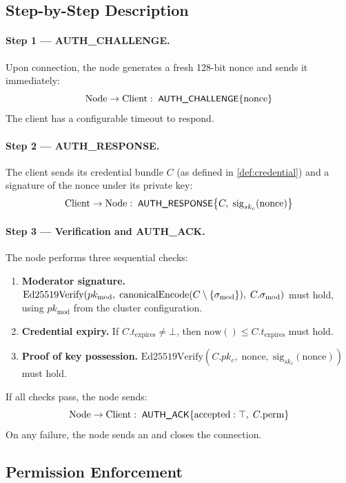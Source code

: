 \subsection{Step-by-Step Description}

\paragraph{Step 1 — AUTH\_CHALLENGE.}
Upon connection, the node generates a fresh 128-bit nonce and sends it
immediately:
\[
  \mathrm{Node} \to \mathrm{Client}:\; \textsf{\small AUTH\_CHALLENGE}\{\mathrm{nonce}\}
\]
The client has a configurable timeout to respond.

\paragraph{Step 2 — AUTH\_RESPONSE.}
The client sends its credential bundle $C$ (as defined in
\cref{def:credential}) and a signature of the nonce under its private key:
\[
  \mathrm{Client} \to \mathrm{Node}:\;
  \textsf{\small AUTH\_RESPONSE}\bigl\{C,\; \mathrm{sig}_{sk_c}(\mathrm{nonce})\bigr\}
\]

\paragraph{Step 3 — Verification and AUTH\_ACK.}
The node performs three sequential checks:
\begin{enumerate}[leftmargin=1.5em]
  \item \textbf{Moderator signature.}
    $\mathrm{Ed25519Verify}(pk_{\mathrm{mod}},\; \mathrm{canonicalEncode}(C \setminus \{\sigma_{\mathrm{mod}}\}),\; C.\sigma_{\mathrm{mod}})$
    must hold, using $pk_{\mathrm{mod}}$ from the cluster configuration.

  \item \textbf{Credential expiry.}
    If $C.t_{\mathrm{expires}} \neq \bot$, then
    $\mathrm{now}() \leq C.t_{\mathrm{expires}}$ must hold.

  \item \textbf{Proof of key possession.}
    $\mathrm{Ed25519Verify}(C.pk_c,\; \mathrm{nonce},\; \mathrm{sig}_{sk_c}(\mathrm{nonce}))$
    must hold.
\end{enumerate}
If all checks pass, the node sends:
\[
  \mathrm{Node} \to \mathrm{Client}:\;
  \textsf{\small AUTH\_ACK}\{\mathrm{accepted}: \top,\; C.\mathrm{perm}\}
\]
On any failure, the node sends an  and closes the connection.

\subsection{Permission Enforcement}

